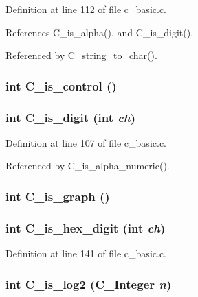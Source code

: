 Definition at line 112 of file c\_\-basic.c.

References C\_\-is\_\-alpha(), and C\_\-is\_\-digit().

Referenced by C\_\-string\_\-to\_\-char().
\subsubsection{\setlength{\rightskip}{0pt plus 5cm}int C\_\-is\_\-control ()}\label{c__basic_8h_f54db975069c1b8f295c82a7af05d58e}


\subsubsection{\setlength{\rightskip}{0pt plus 5cm}int C\_\-is\_\-digit (int {\em ch})}\label{c__basic_8h_3394dec4989e7893a34db2041fb93cb7}




Definition at line 107 of file c\_\-basic.c.

Referenced by C\_\-is\_\-alpha\_\-numeric().
\subsubsection{\setlength{\rightskip}{0pt plus 5cm}int C\_\-is\_\-graph ()}\label{c__basic_8h_b4e4f28c65c5055803018a25748b33c6}


\subsubsection{\setlength{\rightskip}{0pt plus 5cm}int C\_\-is\_\-hex\_\-digit (int {\em ch})}\label{c__basic_8h_4dfe30f969fa9b6b5bebc9b973f95703}




Definition at line 141 of file c\_\-basic.c.
\subsubsection{\setlength{\rightskip}{0pt plus 5cm}int C\_\-is\_\-log2 (\bf{C\_\-Integer} {\em n})}\label{c__basic_8h_5a73b745b65284d2ac1738e01f815025}




